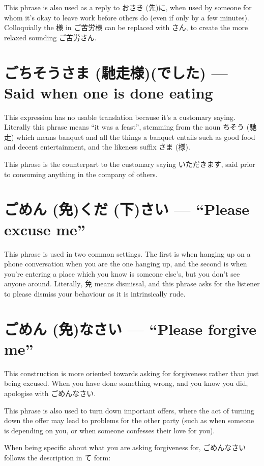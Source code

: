 \documentclass[11pt, b5paper, twoside, openright, onecolumn]{book}
\makeatletter
\newcommand*{\rubystack}[2]{{\relscale{0.5}%
  \begin{tabular}[b]{@{}c@{}}%
    {#1}\\%
   {\textscale{2}{#2}}%
  \end{tabular}}%
}
\DeclareRobustCommand*{\ruby}[2]{%
  \mbox{%
    \setlength{\parskip}{0ex}%
    \BeginAccSupp{method=pdfstringdef,ActualText={#1}}%
      \rubystack{\phantom{#2}}{#1}%
      \llap{%
        \rubystack{#2}{\phantom{#1}}%
      }%
    \EndAccSupp{}%
  }%
}
\renewcommand*{\ruby}[2]{#2 (#1)}%
\makeatother
\begin{document}
This phrase is also used as a reply to お\ruby{先}{さき}に‚ when used by someone for whom it’s okay to leave work before others do (even if only by a few minutes). Colloquially the 様 in ご苦労様 can be replaced with さん‚ to create the more relaxed sounding ご苦労さん.

\section*{ご\ruby{馳走様}{ちそうさま}(でした) — Said when one is done eating}

This expression has no usable translation because it’s a customary saying. Literally this phrase means “it was a feast”‚ stemming from the noun \ruby{馳走}{ちそう} which means banquet and all the things a banquet entails such as good food and decent entertainment‚ and the likeness suffix \ruby{様}{さま}.

This phrase is the counterpart to the customary saying いただきます‚ said prior to consuming anything in the company of others.

\section*{ご\ruby{免}{めん}\ruby{下}{くだ}さい — “Please excuse me”}

This phrase is used in two common settings. The first is when hanging up on a phone conversation when you are the one hanging up‚ and the second is when you’re entering a place which you know is someone else’s‚ but you don’t see anyone around. Literally‚ 免 means dismissal‚ and this phrase asks for the listener to please dismiss your behaviour as it is intrinsically rude.

\section*{ご\ruby{免}{めん}なさい — “Please forgive me”}

This construction is more oriented towards asking for forgiveness rather than just being excused. When you have done something wrong‚ and you know you did‚ apologise with ごめんなさい.

This phrase is also used to turn down important offers‚ where the act of turning down the offer may lead to problems for the other party (such as when someone is depending on you‚ or when someone confesses their love for you).

When being specific about what you are asking forgiveness for‚ ごめんなさい follows the description in て form:
\end{document}
